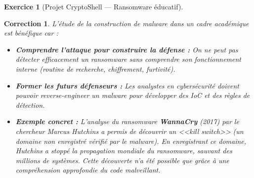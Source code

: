 \documentclass[a4paper,11pt]{article}
\theoremstyle{plain}
\newtheorem{correction}{Correction}
\theoremstyle{definition}
\newtheorem{exercice}{Exercice}
\begin{document}
\begin{exercice}[Projet CryptoShell --- Ransomware éducatif]
\begin{correction}
L'étude de la construction de malware dans un cadre académique est bénéfique car :
\begin{itemize}
    \item \textbf{Comprendre l'attaque pour construire la défense :} On ne peut pas détecter efficacement un ransomware sans comprendre son fonctionnement interne (routine de recherche, chiffrement, furtivité).
    \item \textbf{Former les futurs défenseurs :} Les analystes en cybersécurité doivent pouvoir reverse-engineer un malware pour développer des IoC et des règles de détection.
    \item \textbf{Exemple concret :} L'analyse du ransomware \textbf{WannaCry} (2017) par le chercheur Marcus Hutchins a permis de découvrir un <<kill switch>> (un domaine non enregistré vérifié par le malware). En enregistrant ce domaine, Hutchins a stoppé la propagation mondiale du ransomware, sauvant des millions de systèmes. Cette découverte n'a été possible que grâce à une compréhension approfondie du code malveillant.
\end{itemize}

\end{correction}


\end{exercice}
\end{document}
